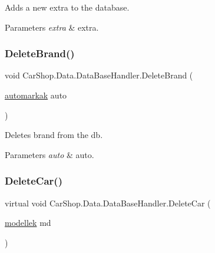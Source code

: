 Adds a new extra to the database. 


\begin{DoxyParams}{Parameters}
{\em extra} & extra.\\
\hline
\end{DoxyParams}
\mbox{\label{class_car_shop_1_1_data_1_1_data_base_handler_adc585650f1061f34034769e941dd05ec}} 
\subsubsection{\texorpdfstring{Delete\+Brand()}{DeleteBrand()}}
{\footnotesize\ttfamily void Car\+Shop.\+Data.\+Data\+Base\+Handler.\+Delete\+Brand (\begin{DoxyParamCaption}\item[{\mbox{\hyperlink{class_car_shop_1_1_data_1_1automarkak}{automarkak}}}]{auto }\end{DoxyParamCaption})}



Deletes brand from the db. 


\begin{DoxyParams}{Parameters}
{\em auto} & auto.\\
\hline
\end{DoxyParams}
\mbox{\label{class_car_shop_1_1_data_1_1_data_base_handler_a1ddb3e7a30ee321d3491593519734fec}} 
\subsubsection{\texorpdfstring{Delete\+Car()}{DeleteCar()}}
{\footnotesize\ttfamily virtual void Car\+Shop.\+Data.\+Data\+Base\+Handler.\+Delete\+Car (\begin{DoxyParamCaption}\item[{\mbox{\hyperlink{class_car_shop_1_1_data_1_1modellek}{modellek}}}]{md }\end{DoxyParamCaption})\hspace{0.3cm}{\ttfamily [virtual]}}



